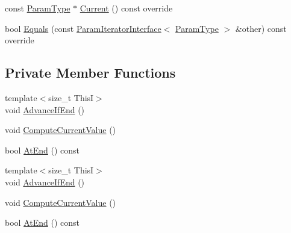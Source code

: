 \begin{DoxyCompactItemize}
\item 
const \mbox{\hyperlink{classtesting_1_1internal_1_1_cartesian_product_generator_af27131157a9347f0c82420ca081ee7dd}{Param\+Type}} $\ast$ \mbox{\hyperlink{classtesting_1_1internal_1_1_cartesian_product_generator_1_1_iterator_impl_3_01_index_sequence_3_01_i_8_8_8_01_4_01_4_ab7052f320ab8ff3113a3e744a1bff07e}{Current}} () const override
\item 
bool \mbox{\hyperlink{classtesting_1_1internal_1_1_cartesian_product_generator_1_1_iterator_impl_3_01_index_sequence_3_01_i_8_8_8_01_4_01_4_a7ba6129ccd025c1cb0e00fe71b8c8489}{Equals}} (const \mbox{\hyperlink{classtesting_1_1internal_1_1_param_iterator_interface}{Param\+Iterator\+Interface}}$<$ \mbox{\hyperlink{classtesting_1_1internal_1_1_cartesian_product_generator_af27131157a9347f0c82420ca081ee7dd}{Param\+Type}} $>$ \&other) const override
\end{DoxyCompactItemize}
\subsection*{Private Member Functions}
\begin{DoxyCompactItemize}
\item 
{\footnotesize template$<$size\+\_\+t ThisI$>$ }\\void \mbox{\hyperlink{classtesting_1_1internal_1_1_cartesian_product_generator_1_1_iterator_impl_3_01_index_sequence_3_01_i_8_8_8_01_4_01_4_a6a5fd8b4a0cd8e27c0ca1fbbfee4f997}{Advance\+If\+End}} ()
\item 
void \mbox{\hyperlink{classtesting_1_1internal_1_1_cartesian_product_generator_1_1_iterator_impl_3_01_index_sequence_3_01_i_8_8_8_01_4_01_4_a0e6c088fed9a27254a657755d05bdcae}{Compute\+Current\+Value}} ()
\item 
bool \mbox{\hyperlink{classtesting_1_1internal_1_1_cartesian_product_generator_1_1_iterator_impl_3_01_index_sequence_3_01_i_8_8_8_01_4_01_4_abdf53ad1a435b992d399210178b35b70}{At\+End}} () const
\item 
{\footnotesize template$<$size\+\_\+t ThisI$>$ }\\void \mbox{\hyperlink{classtesting_1_1internal_1_1_cartesian_product_generator_1_1_iterator_impl_3_01_index_sequence_3_01_i_8_8_8_01_4_01_4_a6a5fd8b4a0cd8e27c0ca1fbbfee4f997}{Advance\+If\+End}} ()
\item 
void \mbox{\hyperlink{classtesting_1_1internal_1_1_cartesian_product_generator_1_1_iterator_impl_3_01_index_sequence_3_01_i_8_8_8_01_4_01_4_a0e6c088fed9a27254a657755d05bdcae}{Compute\+Current\+Value}} ()
\item 
bool \mbox{\hyperlink{classtesting_1_1internal_1_1_cartesian_product_generator_1_1_iterator_impl_3_01_index_sequence_3_01_i_8_8_8_01_4_01_4_abdf53ad1a435b992d399210178b35b70}{At\+End}} () const
\end{DoxyCompactItemize}
